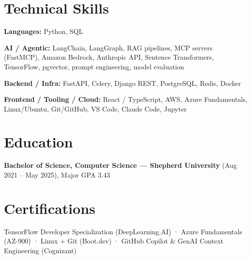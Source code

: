 \documentclass[10pt]{article}
\begin{document}
\section*{Technical Skills}
\noindent \textbf{Languages:} Python, SQL\par
\noindent \textbf{AI / Agentic:} LangChain, LangGraph, RAG pipelines, MCP servers (FastMCP), Amazon Bedrock, Anthropic API, Sentence Transformers, TensorFlow, pgvector, prompt engineering, model evaluation\par
\noindent \textbf{Backend / Infra:} FastAPI, Celery, Django REST, PostgreSQL, Redis, Docker\par
\noindent \textbf{Frontend / Tooling / Cloud:} React / TypeScript, AWS, Azure Fundamentals, Linux/Ubuntu, Git/GitHub, VS Code, Claude Code, Jupyter\par
\section*{Education}
\noindent \textbf{Bachelor of Science, Computer Science — Shepherd University} (Aug 2021 – May 2025), Major GPA 3.43\par
\section*{Certifications}
\noindent TensorFlow Developer Specialization (DeepLearning.AI) · Azure Fundamentals (AZ-900) · Linux + Git (Boot.dev) · GitHub Copilot \& GenAI Context Engineering (Cognizant)\par
\end{document}
